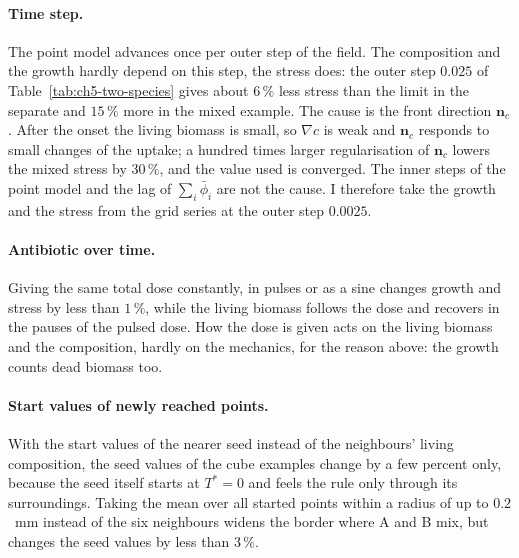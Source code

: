 \paragraph{Time step.} The point model advances once per outer step of the field. The composition and the growth hardly
depend on this step, the stress does: the outer step $0.025$ of Table~\ref{tab:ch5-two-species} gives about $6\,\%$ less
stress than the limit in the separate and $15\,\%$ more in the mixed example. The cause is the front direction
$\mathbf n_c$. After the onset the living biomass is small, so $\nabla c$ is weak and $\mathbf n_c$ responds to small
changes of the uptake; a hundred times larger regularisation of $\mathbf n_c$ lowers the mixed stress by $30\,\%$, and the
value used is converged. The inner steps of the point model and the lag of $\sum_i\bar\phi_i$ are not the cause. I
therefore take the growth and the stress from the grid series at the outer step $0.0025$.

\paragraph{Antibiotic over time.} Giving the same total dose constantly, in pulses or as a sine changes growth and stress
by less than $1\,\%$, while the living biomass follows the dose and recovers in the pauses of the pulsed dose. How the
dose is given acts on the living biomass and the composition, hardly on the mechanics, for the reason above: the growth
counts dead biomass too.

\paragraph{Start values of newly reached points.} With the start values of the nearer seed instead of the neighbours'
living composition, the seed values of the cube examples change by a few percent only, because the seed itself starts at
$T^*=0$ and feels the rule only through its surroundings. Taking the mean over all started points within a radius of up to
$0.2$~mm instead of the six neighbours widens the border where A and B mix, but changes the seed values by less than
$3\,\%$.

